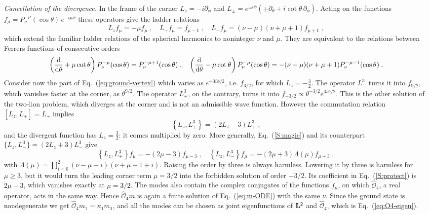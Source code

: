 \emph{Cancellation of the divergence.} In the frame of the corner $L_z = - i \partial_\phi$ and $L_\pm = e^{\pm i \phi} \left( \pm \partial_\theta + i \cot \theta \, \partial_\phi \right)$. Acting on the functions $f_\mu = P_\nu^{-\mu}(\cos \theta) \, e^{- i \mu \phi}$ these operators give the ladder relations
\begin{equation} \label{S:ladder}
    L_z f_\mu = - \mu f_\mu \;, \quad L_+ f_\mu = f_{\mu - 1} \;, \quad L_- f_\mu = (\nu - \mu)(\nu + \mu + 1) f_{\mu + 1} \;,
\end{equation}
which extend the familiar ladder relations of the spherical harmonics to noninteger $\nu$ and $\mu$. They are equivalent to the relations between Ferrers functions of consecutive orders \cite{DLMF}
\begin{equation} \label{S:ferrers-ladder}
    \left( \dv{}{\theta} + \mu \cot \theta \right) P_\nu^{-\mu}(\cos \theta) = P_\nu^{-\mu + 1}(\cos \theta) \;, \quad \left( \dv{}{\theta} - \mu \cot \theta \right) P_\nu^{-\mu}(\cos \theta) = - (\nu - \mu)(\nu + \mu + 1) P_\nu^{-\mu - 1}(\cos \theta) \;.
\end{equation}
Consider now the part of Eq.~(\ref{eq:ground-vertex}) which varies as $e^{-3 i \phi/2}$, i.e. $f_{3/2}$, for which $L_z = - \frac{3}{2}$. The operator $L_-^3$ turns it into $f_{9/2}$, which vanishes faster at the corner, as $\theta^{9/2}$. The operator $L_+^3$, on the contrary, turns it into $f_{-3/2} \propto \theta^{-3/2} e^{3 i \phi/2}$. This is the other solution of the two-lion problem, which diverges at the corner and is not an admissible wave function. However the commutation relation $[L_z, L_+] = L_+$ implies
\begin{equation} \label{S:magic}
    \left\{ L_z, L_+^3 \right\} = \left( 2 L_z - 3 \right) L_+^3 \;,
\end{equation}
and the divergent function has $L_z = \frac{3}{2}$: it comes multiplied by zero. More generally, Eq.~(\ref{S:magic}) and its counterpart $\{ L_z, L_-^3 \} = (2 L_z + 3) L_-^3$ give
\begin{equation} \label{S:protect}
    \left\{ L_z, L_+^3 \right\} f_\mu = - (2 \mu - 3) f_{\mu - 3} \;, \quad \left\{ L_z, L_-^3 \right\} f_\mu = - (2 \mu + 3) \Lambda(\mu) f_{\mu + 3} \;,
\end{equation}
with $\Lambda(\mu) = \prod_{i = 0}^{2} (\nu - \mu - i)(\nu + \mu + 1 + i)$. Raising the order by three is always harmless. Lowering it by three is harmless for $\mu \geq 3$, but it would turn the leading corner term $\mu = 3/2$ into the forbidden solution of order $-3/2$. Its coefficient in Eq.~(\ref{S:protect}) is $2 \mu - 3$, which vanishes exactly at $\mu = 3/2$. The modes also contain the complex conjugates of the functions $f_\mu$, on which $\hat{\mathcal{O}}_4$, a real operator, acts in the same way. Hence $\hat{\mathcal{O}}_4 m$ is again a finite solution of Eq.~(\ref{eq:m-ODE}) with the same $\nu$. Since the ground state is nondegenerate we get $\hat{\mathcal{O}}_4 m_1 = \kappa_1 m_1$, and all the modes can be chosen as joint eigenfunctions of $\vb{L}^2$ and $\hat{\mathcal{O}}_4$, which is Eq.~(\ref{eq:O4-eigen}).

